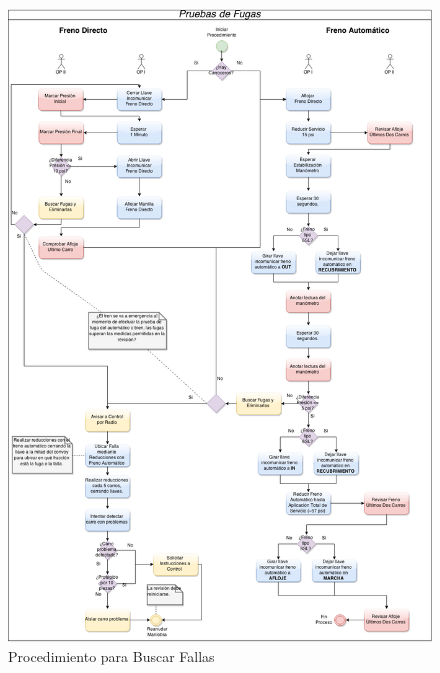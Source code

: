 \documentclass[oneside,12pt, letterpaper, titlepage]{book}
\begin{document}
\begin{appendices}
\begin{figure}[H]
    \centering
    \includegraphics[scale=0.35]{./images/MPF}
    \caption{Procedimiento para Buscar Fallas}
    \label{fig:MPF}
\end{figure}



\end{appendices}
\end{document}

